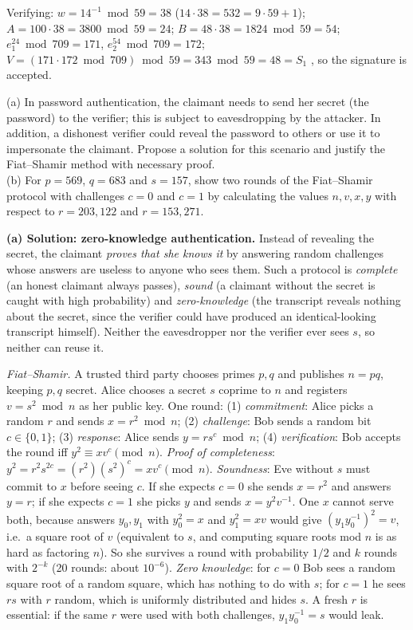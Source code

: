 Verifying: $w = 14^{-1} \bmod 59 = 38$ ($14 \cdot 38 = 532 = 9 \cdot 59 + 1$); $A = 100 \cdot 38 = 3800 \bmod 59 = 24$; $B = 48 \cdot 38 = 1824 \bmod 59 = 54$; $e_1^{24} \bmod 709 = 171$, $e_2^{54} \bmod 709 = 172$; $V = (171 \cdot 172 \bmod 709) \bmod 59 = 343 \bmod 59 = 48 = S_1$ \checkmark, so the signature is accepted.

\begin{keybox}[title={Q3 (10 marks)}]
(a) In password authentication, the claimant needs to send her secret (the password) to the verifier; this is subject to eavesdropping by the attacker. In addition, a dishonest verifier could reveal the password to others or use it to impersonate the claimant. Propose a solution for this scenario and justify the Fiat--Shamir method with necessary proof.\\
(b) For $p = 569$, $q = 683$ and $s = 157$, show two rounds of the Fiat--Shamir protocol with challenges $c = 0$ and $c = 1$ by calculating the values $n, v, x, y$ with respect to $r = 203{,}122$ and $r = 153{,}271$.
\end{keybox}

\textbf{(a) Solution: zero-knowledge authentication.} Instead of revealing the secret, the claimant \emph{proves that she knows it} by answering random challenges whose answers are useless to anyone who sees them. Such a protocol is \emph{complete} (an honest claimant always passes), \emph{sound} (a claimant without the secret is caught with high probability) and \emph{zero-knowledge} (the transcript reveals nothing about the secret, since the verifier could have produced an identical-looking transcript himself). Neither the eavesdropper nor the verifier ever sees $s$, so neither can reuse it.

\emph{Fiat--Shamir.} A trusted third party chooses primes $p, q$ and publishes $n = pq$, keeping $p, q$ secret. Alice chooses a secret $s$ coprime to $n$ and registers $v = s^2 \bmod n$ as her public key. One round: (1) \emph{commitment}: Alice picks a random $r$ and sends $x = r^2 \bmod n$; (2) \emph{challenge}: Bob sends a random bit $c \in \{0, 1\}$; (3) \emph{response}: Alice sends $y = r s^c \bmod n$; (4) \emph{verification}: Bob accepts the round iff $y^2 \equiv x v^c \pmod n$.
\emph{Proof of completeness}: $y^2 = r^2 s^{2c} = (r^2)(s^2)^c = x v^c \pmod n$.
\emph{Soundness}: Eve without $s$ must commit to $x$ before seeing $c$. If she expects $c = 0$ she sends $x = r^2$ and answers $y = r$; if she expects $c = 1$ she picks $y$ and sends $x = y^2 v^{-1}$. One $x$ cannot serve both, because answers $y_0, y_1$ with $y_0^2 = x$ and $y_1^2 = x v$ would give $(y_1 y_0^{-1})^2 = v$, i.e.\ a square root of $v$ (equivalent to $s$, and computing square roots mod $n$ is as hard as factoring $n$). So she survives a round with probability $1/2$ and $k$ rounds with $2^{-k}$ (20 rounds: about $10^{-6}$).
\emph{Zero knowledge}: for $c = 0$ Bob sees a random square root of a random square, which has nothing to do with $s$; for $c = 1$ he sees $rs$ with $r$ random, which is uniformly distributed and hides $s$. A fresh $r$ is essential: if the same $r$ were used with both challenges, $y_1 y_0^{-1} = s$ would leak.

